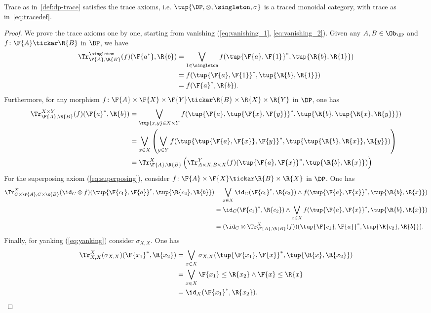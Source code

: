 \begin{lemma}
Trace as in~\cref{def:dp-trace} satisfies the trace axioms, i.e. $\tup{\DP, \otimes, \singleton, \sigma}$ is a traced monoidal category, with trace as in~\cref{eq:tracedef}.
\end{lemma}
\begin{proof}
We prove the trace axioms one by one, starting from vanishing (\cref{eq:vanishing_1}, \cref{eq:vanishing_2}). Given any $A,B\in \Ob_\DP$ and $f\colon \F{A}\tickar \R{B}$ in $\DP$, we have
\begin{equation}
    \begin{aligned}
        \Tr_{\F{A},\R{B}}^{\singleton}(f)(\F{a^*},\R{b})&=\bigvee_{1\in \singleton}f(\tup{\F{a},\F{1}}^*,\tup{\R{b},\R{1}})\\
        &=f(\tup{\F{a},\F{1}}^*,\tup{\R{b},\R{1}})\\
        &=f(\F{a}^*,\R{b}).
    \end{aligned}
\end{equation}
Furthermore, for any morphism $f\colon \F{A}\times \F{X}\times \F{Y} \tickar \R{B}\times \R{X} \times \R{Y}$ in $\DP$, one has
\begin{equation}
    \begin{aligned}
        \Tr_{\F{A},\R{B}}^{X\times Y}(f)(\F{a}^*,\R{b})&=\bigvee_{\tup{x,y} \in X\times Y} f(\tup{\F{a},\tup{\F{x},\F{y}}}^*,\tup{\R{b},\tup{\R{x},\R{y}}})\\
        &=\bigvee_{x \in X}\left(\bigvee_{y \in Y} f(\tup{\tup{\F{a},\F{x}},\F{y}}^*,\tup{\tup{\R{b},\R{x}},\R{y}})\right)\\
        &=\Tr_{\F{A},\R{B}}^X\left(
        \Tr_{A\times X,B\times X}^Y(f)(\tup{\F{a},\F{x}}^*,\tup{\R{b},\R{x}})\right)
    \end{aligned}
\end{equation}
For the superposing axiom (\cref{eq:superposing}), consider $f\colon \F{A}\times \F{X}\tickar \R{B}\times \R{X}$ in $\DP$. One has
\begin{equation}
    \begin{aligned}
        \Tr_{C\times \F{A},C\times \R{B}}^{X}(\id_C\otimes f)(\tup{\F{c_1},\F{a}}^*,\tup{\R{c_2},\R{b}})&=\bigvee_{x\in X} \id_C(\F{c_1}^*,\R{c_2})\wedge f(\tup{\F{a},\F{x}}^*,\tup{\R{b},\R{x}})\\
        &=\id_C(\F{c_1}^*,\R{c_2}) \wedge \bigvee_{x\in X} f(\tup{\F{a},\F{x}}^*,\tup{\R{b},\R{x}})\\
        &=(\id_C \otimes \Tr_{\F{A},\R{B}}^X(f))(\tup{\F{c_1},\F{a}}^*,\tup{\R{c_2},\R{b}}).
    \end{aligned}
\end{equation}
Finally, for yanking (\cref{eq:yanking}) consider $\sigma_{X,X}$. One has
\begin{equation}
    \begin{aligned}
        \Tr_{X,X}^{X}(\sigma_{X,X})(\F{x_1}^*,\R{x_2})&=\bigvee_{x\in X} \sigma_{X,X}(\tup{\F{x_1},\F{x}}^*,\tup{\R{x},\R{x_2}}) \\
        &=\bigvee_{x\in X} \F{x_1} \leq \R{x_2} \wedge \F{x}\leq \R{x}\\
        &=\id_X(\F{x_1}^*,\R{x_2}).
    \end{aligned}
\end{equation}
\end{proof}